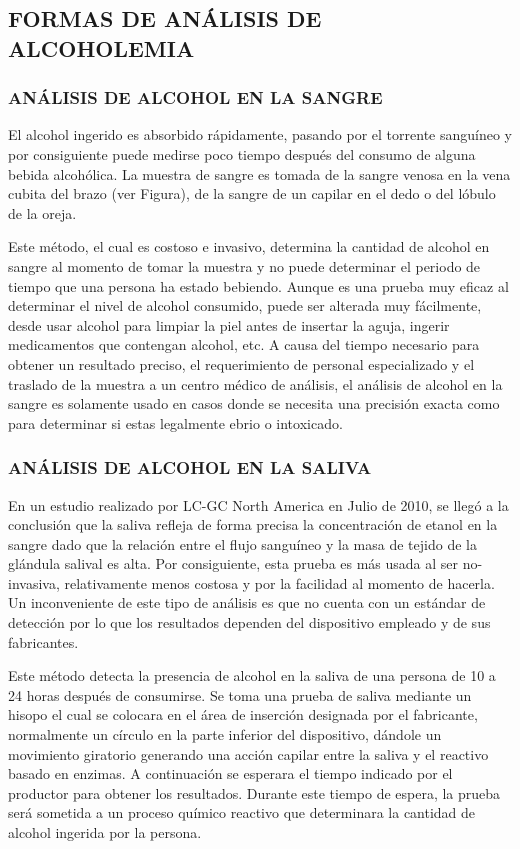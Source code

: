 \subsection{FORMAS DE ANÁLISIS DE ALCOHOLEMIA}
\subsubsection{ANÁLISIS DE ALCOHOL EN LA SANGRE}
El alcohol ingerido es absorbido rápidamente, pasando por el torrente sanguíneo y por consiguiente puede medirse poco tiempo después del consumo de alguna bebida alcohólica. La muestra de sangre es tomada de la sangre venosa en la vena cubita del brazo (ver Figura), de la sangre de un capilar en el dedo o del lóbulo de la oreja. \par
Este método, el cual es costoso e invasivo, determina la cantidad de alcohol en sangre al momento de tomar la muestra y no puede determinar el periodo de tiempo que una persona ha estado bebiendo. Aunque es una prueba muy eficaz al determinar el nivel de alcohol consumido, puede ser alterada muy fácilmente, desde usar alcohol para limpiar la piel antes de insertar la aguja, ingerir medicamentos que contengan alcohol, etc. A causa del tiempo necesario para obtener un resultado preciso, el requerimiento de personal especializado y el traslado de la muestra a un centro médico de análisis, el análisis de alcohol en la sangre es solamente usado en casos donde se necesita una precisión exacta como para determinar si estas legalmente ebrio o intoxicado. 
\subsubsection{ANÁLISIS DE ALCOHOL EN LA SALIVA}
En un estudio realizado por LC-GC North America en Julio de 2010, se llegó a la conclusión que la saliva refleja de forma precisa la concentración de etanol en la sangre dado que la relación entre el flujo sanguíneo y la masa de tejido de la glándula salival es alta. Por consiguiente, esta prueba es más usada al ser no-invasiva, relativamente menos costosa y por la facilidad al momento de hacerla. Un inconveniente de este tipo de análisis es que no cuenta con un estándar de detección por lo que los resultados dependen del dispositivo empleado y de sus fabricantes. \par
Este método detecta la presencia de alcohol en la saliva de una persona de 10 a 24 horas después de consumirse. Se toma una prueba de saliva mediante un hisopo el cual se colocara en el área de inserción designada por el fabricante, normalmente un círculo en la parte inferior del dispositivo, dándole un movimiento giratorio generando una acción capilar entre la saliva y el reactivo basado en enzimas. A continuación se esperara el tiempo indicado por el productor para obtener los resultados. Durante este tiempo de espera, la prueba será sometida a un proceso químico reactivo que determinara la cantidad de alcohol ingerida por la persona.
